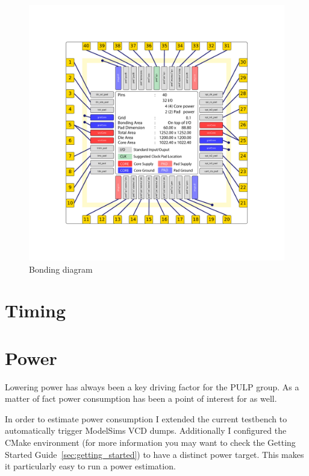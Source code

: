 \begin{figure}[tb]
  \centering
  \includegraphics[width=\linewidth]{./figures/pad_instaces_img_ord}
  \caption{Bonding diagram}
  \label{fig:bonding_diagram}
\end{figure}

\section{Timing}


\section{Power}

Lowering power has always been a key driving factor for the PULP group. As a matter of fact power consumption has been a point of interest for \pulpino as well.

In order to estimate power consumption I extended the current testbench to automatically trigger ModelSims VCD dumps. Additionally I configured the CMake environment (for more information you may want to check the Getting Started Guide~\ref{sec:getting_started}) to have a distinct power target. This makes it particularly easy to run a power estimation.

